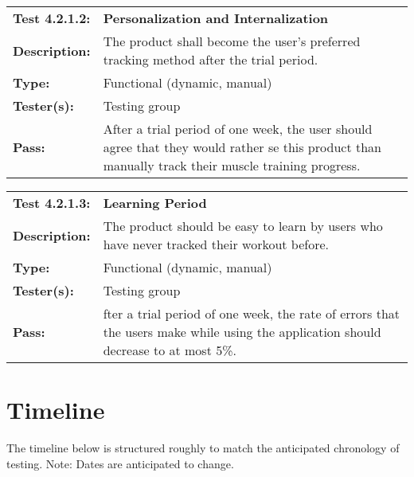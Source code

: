 \documentclass{article}
\newenvironment{testcase}
    {
    \begin{center}
    \begin{mdframed}[
        userdefinedwidth=15.5cm,
        leftmargin=1cm,
        rightmargin=1cm
        ]
    \begin{tabular}{p{2.5cm} p{9cm}}
    }
    {
    \end{tabular}
    \end{mdframed}
    \end{center}
    }
\newcommand{\tctit}[2]{\textbf{#1} & \textbf{#2}}
\newcommand{\tcdesc}{\textbf{Description:}}
\newcommand{\tctype}{\textbf{Type:}}
\newcommand{\testers}{\textbf{Tester(s):}}
\newcommand{\tcpass}{\textbf{Pass:}}
\begin{document}
\begingroup
\begin{testcase}
    \tctit{Test 4.2.1.2:}{Personalization and Internalization} \\
    \tcdesc & The product shall become the user’s preferred tracking method after the trial period.  \\
    \tctype & Functional (dynamic, manual)\\
    \testers & Testing group\\
    \tcpass & After a trial period of one week, the user should agree that they would rather se this product than manually track their muscle training progress.\\
\end{testcase}
\endgroup

\begingroup
\begin{testcase}
    \tctit{Test 4.2.1.3:}{Learning Period} \\
    \tcdesc & The product should be easy to learn by users who have never tracked their workout before.  \\
    \tctype & Functional (dynamic, manual)\\
    \testers & Testing group\\
    \tcpass & fter a trial period of one week, the rate of errors that the users make while using the application should decrease to at most 5\%. \\
\end{testcase}
\endgroup

\section{Timeline}
The timeline below is structured roughly to match the anticipated chronology of testing. Note: Dates are anticipated to change. 
\end{document}
